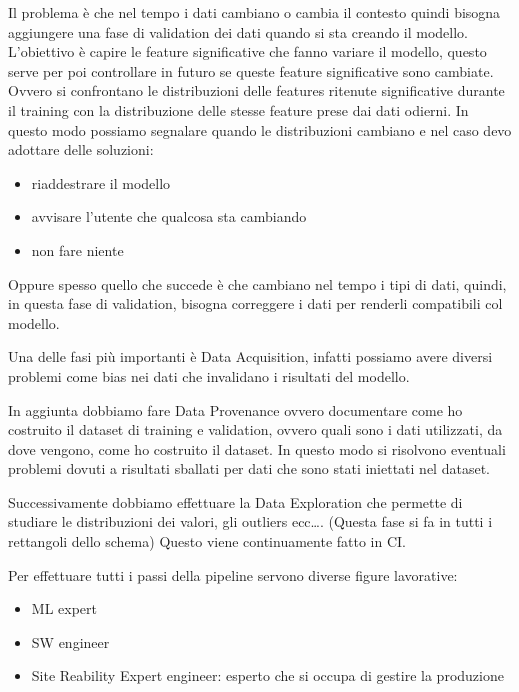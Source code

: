 Il problema è che nel tempo i dati cambiano o cambia il contesto quindi bisogna 
aggiungere una fase di validation dei dati quando si sta creando il modello.
L'obiettivo è capire le feature significative che fanno variare il modello,
questo serve per poi controllare in futuro se queste feature significative sono 
cambiate. Ovvero si confrontano le distribuzioni delle features ritenute significative 
durante il training con la distribuzione delle stesse feature prese dai dati odierni.
In questo modo possiamo segnalare quando le distribuzioni cambiano e nel caso devo
adottare delle soluzioni:
\begin{itemize}
    \item riaddestrare il modello
    \item avvisare l'utente che qualcosa sta cambiando
    \item non fare niente
\end{itemize}
Oppure spesso quello che succede è che cambiano nel tempo i tipi di dati, quindi, 
in questa fase di validation, bisogna correggere i dati per renderli compatibili col
modello.

Una delle fasi più importanti è Data Acquisition, infatti possiamo avere diversi 
problemi come bias nei dati che invalidano i risultati del modello.

In aggiunta dobbiamo fare Data Provenance ovvero documentare come ho costruito 
il dataset di training e validation, ovvero quali sono i dati utilizzati, da dove 
vengono, come ho costruito il dataset. In questo modo si risolvono eventuali problemi
dovuti a risultati sballati per dati che sono stati iniettati nel dataset.

Successivamente dobbiamo effettuare la Data Exploration che permette di studiare 
le distribuzioni dei valori, gli outliers ecc\dots. (Questa fase si fa in tutti i rettangoli 
dello schema) Questo viene continuamente fatto in CI.

Per effettuare tutti i passi della pipeline servono diverse figure lavorative:
\begin{itemize}
    \item ML expert 
    \item SW engineer
    \item Site Reability Expert engineer: esperto che si occupa di gestire la produzione
\end{itemize}


